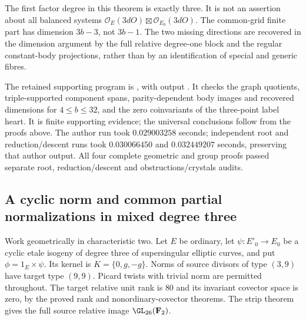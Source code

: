 \begin{remark}
\label{rem:mixed-strip-scope-candidate}
The first factor degree in this theorem is exactly three.
It is not an assertion about all balanced systems
$\mathcal O_E(3dO)\boxtimes\mathcal O_{E_0}(3dO)$.
The common-grid finite part has dimension $3b-3$, not
$3b-1$. The two missing directions are recovered in the
dimension argument by the full relative degree-one block
and the regular constant-body projections, rather than by
an identification of special and generic fibres.

The retained supporting program is
, with output
.
It checks the graph quotients, triple-supported component spans,
parity-dependent body images and recovered dimensions for
$4\le b\le32$, and the zero coinvariants of the three-point
label heart. It is finite supporting evidence; the universal
conclusions follow from the proofs above. The author run took
$0.029003258$ seconds; independent root and reduction/descent
runs took $0.030066450$ and $0.032449207$ seconds, preserving
that author output. All four complete geometric and group proofs
passed separate root, reduction/descent and obstructions/crystals
audits.
\end{remark}


\subsection{A cyclic norm and common partial normalizations in mixed degree three}
\label{subsec:mixed-degree-three-norm-candidate}

Work geometrically in characteristic two. Let $E$ be ordinary,
let $\psi:E'_0\to E_0$ be a cyclic etale isogeny of degree three
of supersingular elliptic curves, and put $\phi=1_E\times\psi$.
Its kernel is $K=\{0,g,-g\}$. Norms of source divisors of type
$(3,9)$ have target type $(9,9)$. Picard twists with trivial
norm are permitted throughout. The target relative unit rank
is $80$ and its invariant covector space is zero, by the proved
rank and nonordinary-covector theorems. The strip theorem gives
the full source relative image $\GL_{26}(\mathbf F_2)$.

